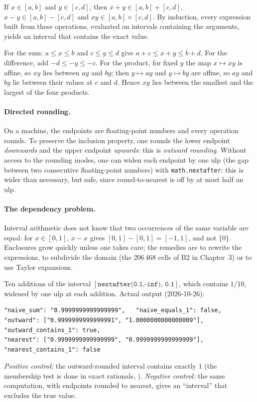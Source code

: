 \begin{theorem}\label{appD:thm:inclusion}
If $x\in[a,b]$ and $y\in[c,d]$, then $x+y\in[a,b]+[c,d]$, $x-y\in[a,b]-[c,d]$ and $xy\in[a,b]\times[c,d]$. By
induction, every expression built from these operations, evaluated on intervals containing the arguments, yields an
interval that contains the exact value.
\end{theorem}

\begin{humanproof}
For the sum: $a\le x\le b$ and $c\le y\le d$ give $a+c\le x+y\le b+d$. For the difference, add $-d\le-y\le-c$. For the
product, for fixed $y$ the map $x\mapsto xy$ is affine, so $xy$ lies between $ay$ and $by$; then $y\mapsto ay$ and
$y\mapsto by$ are affine, so $ay$ and $by$ lie between their values at $c$ and $d$. Hence $xy$ lies between the
smallest and the largest of the four products.
\end{humanproof}

\paragraph{Directed rounding.} On a machine, the endpoints are floating-point numbers and every operation rounds. To
preserve the inclusion property, one rounds the lower endpoint \emph{downwards} and the upper endpoint \emph{upwards}:
this is \emph{outward rounding}. Without access to the rounding modes, one can widen each endpoint by one ulp (the gap
between two consecutive floating-point numbers) with \texttt{math.nextafter}: this is wider than necessary, but safe,
since round-to-nearest is off by at most half an ulp.

\paragraph{The dependency problem.} Interval arithmetic does not know that two occurrences of the same variable are
equal: for $x\in[0,1]$, $x-x$ gives $[0,1]-[0,1]=[-1,1]$, and not $\{0\}$. Enclosures grow quickly unless one takes
care; the remedies are to rewrite the expressions, to subdivide the domain (the 206\,468 cells of B2 in Chapter~3) or
to use Taylor expansions.

\begin{numbox}
Ten additions of the interval $[\texttt{nextafter(0.1,-inf)},\,\texttt{0.1}]$, which contains $1/10$, widened by one
ulp at each addition. Actual output (2026-10-26):
\begin{lstlisting}[style=appC,language={}]
"naive_sum": "0.9999999999999999",   "naive_equals_1": false,
"outward": ["0.9999999999999991", "1.0000000000000009"],   "outward_contains_1": true,
"nearest": ["0.9999999999999999", "0.9999999999999999"],   "nearest_contains_1": false
\end{lstlisting}
\emph{Positive control:} the outward-rounded interval contains exactly $1$ (the membership test is done in exact
rationals, ). \emph{Negative control:} the same computation, with endpoints rounded to
nearest, gives an ``interval'' that excludes the true value.
\end{numbox}

